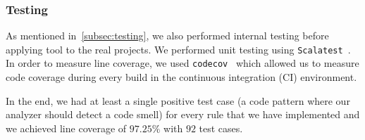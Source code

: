 \FloatBarrier

\subsubsection{Testing}



As mentioned in~\ref{subsec:testing}, we also performed internal testing before applying tool to the real projects.
We performed unit testing using \verb|Scalatest|~\cite{scalatest}.
In order to measure line coverage, we used \verb|codecov|~\cite{codecov} which allowed us to measure
code coverage during every build in the continuous integration (CI) environment.

In the end, we had at least a single positive test case (a code pattern where our analyzer should detect a code smell)
for every rule that we have implemented and we achieved line coverage of $97.25\%$ with $92$ test cases.
